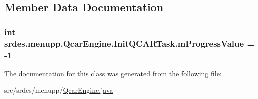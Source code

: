 \subsection{\-Member \-Data \-Documentation}
\hypertarget{classsrdes_1_1menupp_1_1_qcar_engine_1_1_init_q_c_a_r_task_a187824f4d7a34a0adc0ee87f2267fef3}{
\subsubsection[{m\-Progress\-Value}]{\setlength{\rightskip}{0pt plus 5cm}int {\bf srdes.\-menupp.\-Qcar\-Engine.\-Init\-Q\-C\-A\-R\-Task.\-m\-Progress\-Value} = -\/1}}\label{classsrdes_1_1menupp_1_1_qcar_engine_1_1_init_q_c_a_r_task_a187824f4d7a34a0adc0ee87f2267fef3}


\-The documentation for this class was generated from the following file\-:\begin{DoxyCompactItemize}
\item 
src/srdes/menupp/\hyperlink{_qcar_engine_8java}{\-Qcar\-Engine.\-java}\end{DoxyCompactItemize}
